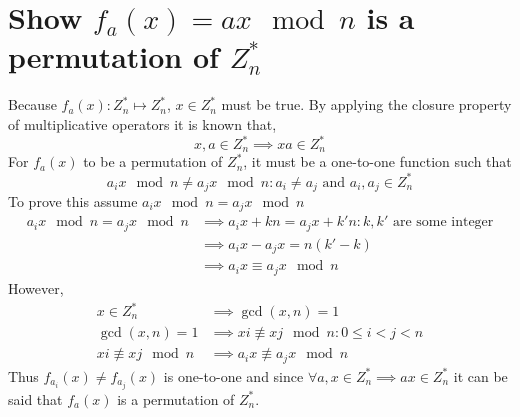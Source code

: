 \documentclass[letterpaper]{article}
\begin{document}
\section{Show $f_a(x)=ax\mod n$ is a permutation of $Z_n^*$}
Because $f_a(x):Z_n^* \mapsto Z_n^*$, $x\in Z_n^*$ must be true. By applying the closure property of multiplicative operators it is known that,
\begin{equation*}
x,a\in Z_n^* \implies xa \in Z_n^*
\end{equation*}
For $f_a(x)$ to be a permutation of $Z_n^*$, it must be a one-to-one function such that 
\begin{equation*}
a_ix\mod n \neq a_jx\mod n : a_i\neq a_j \text{ and }a_i,a_j\in Z_n^*
\end{equation*}
To prove this assume $a_ix\mod n = a_jx\mod n$
\begin{align*}
a_ix\mod n = a_jx\mod n &\implies a_ix+kn = a_jx+k'n:k,k' \text{ are some integer}\\
&\implies a_ix-a_jx = n(k'-k)\\
&\implies a_ix \equiv a_jx\mod n
\end{align*}
However,
\begin{align*}
x\in Z_n^* &\implies \gcd(x,n)=1\\
\gcd(x,n)=1 &\implies xi \not\equiv xj\mod n: 0\leq i<j<n\\
xi \not\equiv xj\mod n &\implies a_ix \not\equiv a_jx\mod n
\end{align*}
Thus $f_{a_i}(x) \neq f_{a_j}(x)$ is one-to-one and since $\forall a,x\in Z_n^*\implies ax\in Z_n^*$ it can be said that $f_a(x)$ is a permutation of $Z_n^*$.
\end{document}
